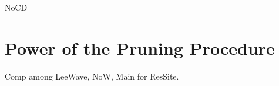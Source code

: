 NoCD


\section{Power of the Pruning Procedure} %
\label{s:power_of_the_pruning_procedure}

Comp among LeeWave, NoW, Main for ResSite.




%
%